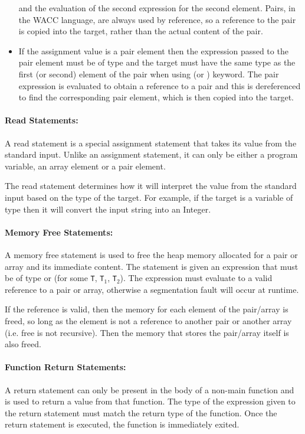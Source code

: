 \documentclass[a4paper]{article}
\theoremstyle{definition}
\begin{document}
\begin{itemize}
       and the evaluation of the second expression for the second element.
       Pairs, in the WACC language, are always used by reference, so a reference to the pair is copied into the target, rather than the actual content of the pair.
 \item If the assignment value is a pair element  then the expression passed to the pair element must be of type  
       and the target must have the same type as the first (or second) element of the pair when using  (or ) keyword.
       The pair expression is evaluated to obtain a reference to a pair and this is dereferenced to find the corresponding pair element,
       which is then copied into the target.
 \end{itemize}

\paragraph{Read Statements:}
A read statement  is a special assignment statement that takes its value from the standard input.
Unlike an assignment statement, it can only be either a program variable, an array element or a pair element.

The read statement determines how it will interpret the value from the standard input based on the type of the target.
For example, if the target is a variable of type  then it will convert the input string into an Integer.

\paragraph{Memory Free Statements:}
A memory free statement  is used to free the heap memory allocated for a pair or array and its immediate content. 
The statement is given an expression that must be of type  or  (for some {\tt T}, {\tt T}$_1$, {\tt T}$_2$). 
The expression must evaluate to a valid reference to a pair or array, otherwise a segmentation fault will occur at runtime.

If the reference is valid, then the memory for each element of the pair/array is freed, so long as the element is not a reference to another pair or another array
(i.e. free is not recursive). 
Then the memory that stores the pair/array itself is also freed.

\paragraph{Function Return Statements:}
A return statement can only be present in the body of a non-main function and is used to return a value from that function. 
The type of the expression given to the return statement must match the return type of the function. 
Once the return statement is executed, the function is immediately exited.
\end{document}
